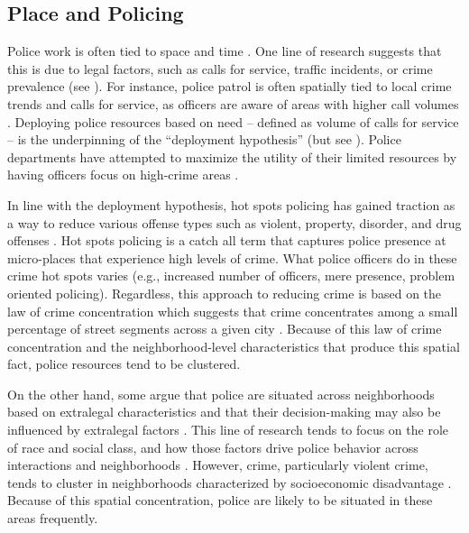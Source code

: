 \subsection{Place and Policing}

Police work is often tied to space and time \parencite{fyfe_police_1991}. One line of research suggests that this is due to legal factors, such as calls for service, traffic incidents, or crime prevalence (see \cite{wilson_dilemmas_1968}). For instance, police patrol is often spatially tied to local crime trends and calls for service, as officers are aware of areas with higher call volumes \parencite{klinger_negotiating_1997}. Deploying police resources based on need – defined as volume of calls for service – is the underpinning of the “deployment hypothesis” (but see \cite{alexander_war_2010, beckett_penal_2010}). Police departments have attempted to maximize the utility of their limited resources by having officers focus on high-crime areas \parencite{skogan_fairness_2004, weisburd_reforming_2003}. 

In line with the deployment hypothesis, hot spots policing has gained traction as a way to reduce various offense types such as violent, property, disorder, and drug offenses \parencite{braga_hot_2019}. Hot spots policing is a catch all term that captures police presence at micro-places that experience high levels of crime. What police officers do in these crime hot spots varies (e.g., increased number of officers, mere presence, problem oriented policing). Regardless, this approach to reducing crime is based on the law of crime concentration which suggests that crime concentrates among a small percentage of street segments across a given city \parencite{braga_benefits_2017, weisburd_law_2015}. Because of this law of crime concentration and the neighborhood-level characteristics that produce this spatial fact, police resources tend to be clustered.

On the other hand, some argue that police are situated across neighborhoods based on extralegal characteristics and that their decision-making may also be influenced by extralegal factors \parencite{alexander_war_2010, avakame_did_1999, kochel_effect_2011}. This line of research tends to focus on the role of race and social class, and how those factors drive police behavior across interactions and neighborhoods \parencite{black_manners_1980}. However, crime, particularly violent crime, tends to cluster in neighborhoods characterized by socioeconomic disadvantage \parencite{peterson_divergent_2010}. Because of this spatial concentration, police are likely to be situated in these areas frequently.

